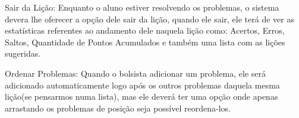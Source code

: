 \begin{alineascomponto}
	\item Sair da Lição: Enquanto o aluno estiver resolvendo os problemas, o 
sistema devera lhe oferecer a opção dele sair da lição, quando ele sair, ele 
terá de ver as estatísticas referentes ao andamento dele naquela lição como: 
Acertos, Erros, Saltos, Quantidade de Pontos Acumulados e também uma lista com 
as lições sugeridas.
	
	\item Ordenar Problemas: Quando o bolsista adicionar um problema, ele será 
adicionado automaticamente logo após os outros problemas daquela mesma lição(se 
pensarmos numa lista), mas ele deverá ter uma opção onde apenas arrastando 
os problemas de posição seja possível reordena-los.

\end{alineascomponto}

